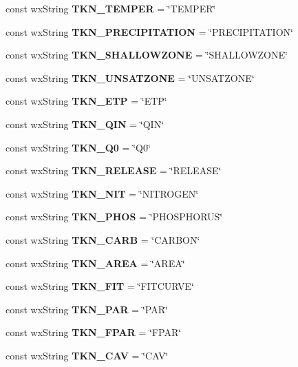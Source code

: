 \begin{DoxyCompactItemize}
\item 
const wx\+String {\bf T\+K\+N\+\_\+\+T\+E\+M\+P\+ER} = \char`\"{}T\+E\+M\+P\+ER\char`\"{}
\item 
const wx\+String {\bf T\+K\+N\+\_\+\+P\+R\+E\+C\+I\+P\+I\+T\+A\+T\+I\+ON} = \char`\"{}P\+R\+E\+C\+I\+P\+I\+T\+A\+T\+I\+ON\char`\"{}
\item 
const wx\+String {\bf T\+K\+N\+\_\+\+S\+H\+A\+L\+L\+O\+W\+Z\+O\+NE} = \char`\"{}S\+H\+A\+L\+L\+O\+W\+Z\+O\+NE\char`\"{}
\item 
const wx\+String {\bf T\+K\+N\+\_\+\+U\+N\+S\+A\+T\+Z\+O\+NE} = \char`\"{}U\+N\+S\+A\+T\+Z\+O\+NE\char`\"{}
\item 
const wx\+String {\bf T\+K\+N\+\_\+\+E\+TP} = \char`\"{}E\+TP\char`\"{}
\item 
const wx\+String {\bf T\+K\+N\+\_\+\+Q\+IN} = \char`\"{}Q\+IN\char`\"{}
\item 
const wx\+String {\bf T\+K\+N\+\_\+\+Q0} = \char`\"{}Q0\char`\"{}
\item 
const wx\+String {\bf T\+K\+N\+\_\+\+R\+E\+L\+E\+A\+SE} = \char`\"{}R\+E\+L\+E\+A\+SE\char`\"{}
\item 
const wx\+String {\bf T\+K\+N\+\_\+\+N\+IT} = \char`\"{}N\+I\+T\+R\+O\+G\+EN\char`\"{}
\item 
const wx\+String {\bf T\+K\+N\+\_\+\+P\+H\+OS} = \char`\"{}P\+H\+O\+S\+P\+H\+O\+R\+US\char`\"{}
\item 
const wx\+String {\bf T\+K\+N\+\_\+\+C\+A\+RB} = \char`\"{}C\+A\+R\+B\+ON\char`\"{}
\item 
const wx\+String {\bf T\+K\+N\+\_\+\+A\+R\+EA} = \char`\"{}A\+R\+EA\char`\"{}
\item 
const wx\+String {\bf T\+K\+N\+\_\+\+F\+IT} = \char`\"{}F\+I\+T\+C\+U\+R\+VE\char`\"{}
\item 
const wx\+String {\bf T\+K\+N\+\_\+\+P\+AR} = \char`\"{}P\+AR\char`\"{}
\item 
const wx\+String {\bf T\+K\+N\+\_\+\+F\+P\+AR} = \char`\"{}F\+P\+AR\char`\"{}
\item 
const wx\+String {\bf T\+K\+N\+\_\+\+C\+AV} = \char`\"{}C\+AV\char`\"{}
\end{DoxyCompactItemize}
